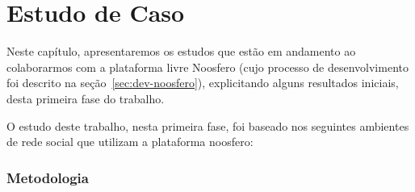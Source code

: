 \chapter{Estudo de Caso}

Neste capítulo, apresentaremos os estudos que estão em andamento ao colaborarmos com a plataforma livre Noosfero (cujo processo de desenvolvimento foi descrito na seção~\ref{sec:dev-noosfero}), explicitando alguns resultados iniciais, desta primeira fase do trabalho.

O estudo deste trabalho, nesta primeira fase, foi baseado nos seguintes ambientes de
rede social que utilizam a plataforma noosfero:
%



\subsection{Metodologia}



